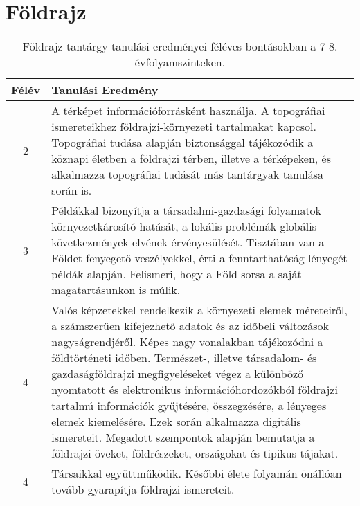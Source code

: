         \section{Földrajz}

       
           \begin{longtable}{c | p{12cm} }
            \caption[Földrajz 7-8.]{Földrajz tantárgy tanulási eredményei féléves bontásokban a 7-8. évfolyamszinteken. }  \\

            \textbf{Félév} & \textbf{Tanulási Eredmény} \\
            \hline
            \endhead
                                
                                          2 &  A térképet információforrásként használja. A topográfiai ismereteikhez földrajzi-környezeti tartalmakat kapcsol. Topográfiai tudása alapján biztonsággal tájékozódik a köznapi életben a földrajzi térben, illetve a térképeken, és alkalmazza topográfiai tudását más tantárgyak tanulása során is. \\ \hline
                                      
                                
                                          3 &  Példákkal bizonyítja a társadalmi-gazdasági folyamatok környezetkárosító hatását, a lokális problémák globális következmények elvének érvényesülését. Tisztában van a Földet fenyegető veszélyekkel, érti a fenntarthatóság lényegét példák alapján. Felismeri, hogy a Föld sorsa a saját magatartásunkon is múlik. \\ \hline
                                      
                                
                                          4 &  Valós képzetekkel rendelkezik a környezeti elemek méreteiről, a számszerűen kifejezhető adatok és az időbeli változások nagyságrendjéről. Képes nagy vonalakban tájékozódni a földtörténeti időben. Természet-, illetve társadalom- és gazdaságföldrajzi megfigyeléseket végez a különböző nyomtatott és elektronikus információhordozókból földrajzi tartalmú információk gyűjtésére, összegzésére, a lényeges elemek kiemelésére. Ezek során alkalmazza digitális ismereteit. Megadott szempontok alapján bemutatja a földrajzi öveket, földrészeket, országokat és tipikus tájakat. \\ \hline
                                          4 &  Társaikkal együttműködik. Későbbi élete folyamán önállóan tovább gyarapítja földrajzi ismereteit. \\ \hline
                                      
                        \end{longtable}
            \clearpage

